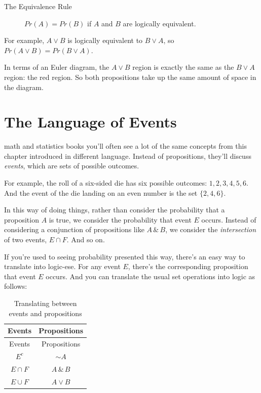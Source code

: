 \documentclass[justified]{tufte-book}
\newcommand{\p}{Pr}
\theoremstyle{definition}
\theoremstyle{definition}
\theoremstyle{definition}
\theoremstyle{remark}
\begin{document}
\begin{description}
\item[The Equivalence Rule]
\(\p(A) = \p(B)\) if \(A\) and \(B\) are logically equivalent.
\end{description}

For example, \(A \vee B\) is logically equivalent to \(B \vee A\), so \(\p(A \vee B) = \p(B \vee A)\).

In terms of an Euler diagram, the \(A \vee B\) region is exactly the same as the \(B \vee A\) region: the red region. So both propositions take up the same amount of space in the diagram.

\hypertarget{the-language-of-events}{%
\section{The Language of Events}\label{the-language-of-events}}

 math and statistics books you'll often see a lot of the same concepts from this chapter introduced in different language. Instead of propositions, they'll discuss \emph{events}, which are sets of possible outcomes.

For example, the roll of a six-sided die has six possible outcomes: \(1, 2, 3, 4, 5, 6\). And the event of the die landing on an even number is the set \(\{2, 4, 6\}\).

In this way of doing things, rather than consider the probability that a proposition \(A\) is true, we consider the probability that event \(E\) occurs. Instead of considering a conjunction of propositions like \(A \,\&\, B\), we consider the \emph{intersection} of two events, \(E \cap F\). And so on.

If you're used to seeing probability presented this way, there's an easy way to translate into logic-ese. For any event \(E\), there's the corresponding proposition that event \(E\) occurs. And you can translate the usual set operations into logic as follows:

\begin{longtable}[]{@{}cc@{}}
\caption{\label{tab:unnamed-chunk-58}Translating between events and propositions}\tabularnewline
\toprule
Events & Propositions\tabularnewline
\midrule
\endfirsthead
\toprule
Events & Propositions\tabularnewline
\midrule
\endhead
\(E^c\) & \(\sim\! A\)\tabularnewline
\(E \cap F\) & \(A \,\&\, B\)\tabularnewline
\(E \cup F\) & \(A \vee B\)\tabularnewline
\bottomrule
\end{longtable}
\end{document}
